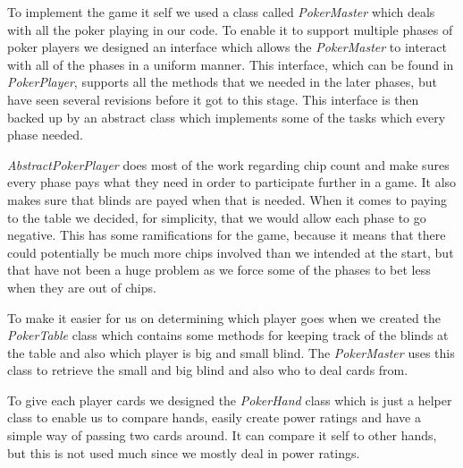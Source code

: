 \documentclass[titlepage, a4paper]{article}
\begin{document}
To implement the game it self we used a class called \textit{PokerMaster} which deals with
all the poker playing in our code. To enable it to support multiple phases of poker players
we designed an interface which allows the \textit{PokerMaster} to interact with all of the
phases in a uniform manner. This interface, which can be found in \textit{PokerPlayer},
supports all the methods that we needed in the later phases, but have seen several revisions
before it got to this stage. This interface is then backed up by an abstract class which
implements some of the tasks which every phase needed.

\textit{AbstractPokerPlayer} does
most of the work regarding chip count and make sures every phase pays what they need in
order to participate further in a game. It also makes sure that blinds are payed when
that is needed. When it comes to paying to the table we decided, for simplicity, that we
would allow each phase to go negative. This has some ramifications for the game, because
it means that there could potentially be much more chips involved than we intended at the
start, but that have not been a huge problem as we force some of the phases to bet less
when they are out of chips.

To make it easier for us on determining which player goes when we created the
\textit{PokerTable} class which contains some methods for keeping track of the
blinds at the table and also which player is big and small blind. The \textit{PokerMaster}
uses this class to retrieve the small and big blind and also who to deal cards from.

To give each player cards we designed the \textit{PokerHand} class which is just a helper
class to enable us to compare hands, easily create power ratings and have a simple way
of passing two cards around. It can compare it self to other hands, but this is not
used much since we mostly deal in power ratings.
\end{document}
